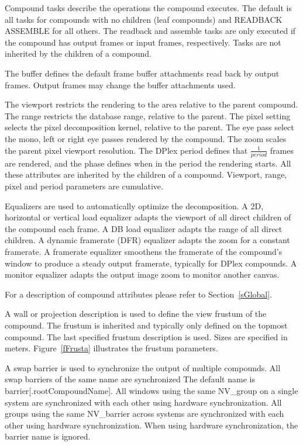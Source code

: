 \documentclass[10pt,a4]{scrartcl}
\newcommand{\fig}[1]{Figure~\ref{#1}}
\newcommand{\sref}[1]{Section~\ref{#1}}
\begin{document}
Compound tasks describe the operations the compound executes. The
default is all tasks for compounds with no children (leaf compounds) and
\textsf{READBACK ASSEMBLE} for all others. The readback and assemble
tasks are only executed if the compound has output frames or input
frames, respectively. Tasks are not inherited by the children of a
compound.

The buffer defines the default frame buffer attachments read back by
output frames. Output frames may change the buffer attachments used.

The viewport restricts the rendering to the area relative to the parent
compound. The range restricts the database range, relative to the
parent. The pixel setting selects the pixel decomposition kernel,
relative to the parent. The eye pass select the mono, left or right eye
passes rendered by the compound. The zoom scales the parent pixel
viewport resolution. The DPlex period defines that $\frac{1}{period}$
frames are rendered, and the phase defines when in the period the
rendering starts. All these attributes are inherited by the children of
a compound. Viewport, range, pixel and period parameters are cumulative.

Equalizers are used to automatically optimize the decomposition. A 2D,
horizontal or vertical load equalizer adapts the viewport of all direct
children of the compound each frame. A DB load equalizer adapts the
range of all direct children. A dynamic framerate (DFR) equalizer adapts
the zoom for a constant framerate. A framerate equalizer
smoothens the framerate of the compound's window to produce a steady
output framerate, typically for DPlex compounds. A monitor equalizer
adapts the output image zoom to monitor another canvas.

For a description of compound attributes please refer to \sref{sGlobal}.

A wall or projection description is used to define the view frustum of
the compound. The frustum is inherited and typically only defined on the
topmost compound. The last specified frustum description is used. Sizes
are specified in meters. \fig{fFrusta} illustrates the frustum
parameters.

A swap barrier is used to synchronize the output of multiple
compounds. All swap barriers of the same name are synchronized The
default name is \textsf{barrier[.root\-Com\-pound\-Name]}. All windows
using the same \textsf{NV\_group} on a single system are synchronized
with each other using hardware synchronization. All groups using the
same \textsf{NV\_barrier} across systems are synchronized with each
other using hardware synchronization. When using hardware
synchronization, the barrier name is ignored.
\end{document}
